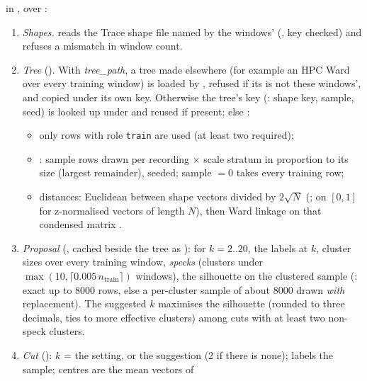  in , over :
\begin{enumerate}
\item \emph{Shapes.}  reads the Trace shape file named by the windows'
   (, key checked) and refuses a mismatch in window count.
\item \emph{Tree} (). With \emph{tree\_path}, a tree made elsewhere (for example an
  HPC Ward over every training window) is loaded by , refused if its
   is not these windows', and copied under its own key. Otherwise the tree's key
  (: shape key, sample, seed) is looked up under
   and reused if present; else :
  \begin{itemize}
  \item only rows with role \texttt{train} are used (at least two required);
  \item {}: sample rows drawn per recording $\times$ scale stratum in
    proportion to its size (largest remainder), seeded; sample $= 0$ takes every training row;
  \item distances: Euclidean between shape vectors divided by $2\sqrt N$ (;
    on $[0,1]$ for z-normalised vectors of length $N$), then  Ward linkage on that
    condensed matrix \citep{ward1963hierarchical}.
  \end{itemize}
\item \emph{Proposal} (, cached beside the tree as ): for
  $k = 2..20$, the labels at $k$, cluster sizes over every training window, \emph{specks} (clusters
  under $\max(10, \lceil 0.005\,n_\text{train}\rceil)$ windows), the silhouette
  \citep{rousseeuw1987silhouettes} on the clustered sample (: exact up to
  8000 rows, else a per-cluster sample of about 8000 drawn \emph{with} replacement). The suggested
  $k$ maximises the silhouette (rounded to three decimals, ties to more effective clusters) among
  cuts with at least two non-speck clusters.
\item \emph{Cut} (): $k$ = the setting, or the suggestion (2 if there is none);
   labels the sample; centres are the mean vectors of

\end{enumerate}

